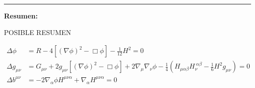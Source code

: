 \documentclass{article}
\numberwithin{equation}{section}
\begin{document}
\vspace{0.4cm}

\rule{\textwidth}{0.4pt}

\vspace{0.2cm}

\begin{boxumen}
\textbf{Resumen:}

POSIBLE RESUMEN

\begin{equation*}
\begin{aligned}
\Delta \phi &= R - 4 \left[ \left(\nabla \phi\right)^2 - \Box \phi \right] - \frac{1}{12} H^2 = 0\\
\Delta g_{\mu\nu} &= G_{\mu\nu} + 2 g_{\mu\nu} \left[ \left(\nabla \phi\right)^2 - \Box \phi \right] + 2 \nabla_{\mu}\nabla_{\nu} \phi - \frac{1}{4} \left( H_{\mu\alpha\beta} H_{\nu}^{ \ \alpha\beta} - \frac{1}{6} H^2 g_{\mu\nu} \right) = 0\\
\Delta b^{\mu\nu} &= -2 \nabla_{\alpha} \phi  H^{\mu\nu \alpha} +  \nabla_{\alpha}H^{\mu\nu \alpha}=0
\end{aligned}
\end{equation*}

\end{boxumen}
 
\end{document}
